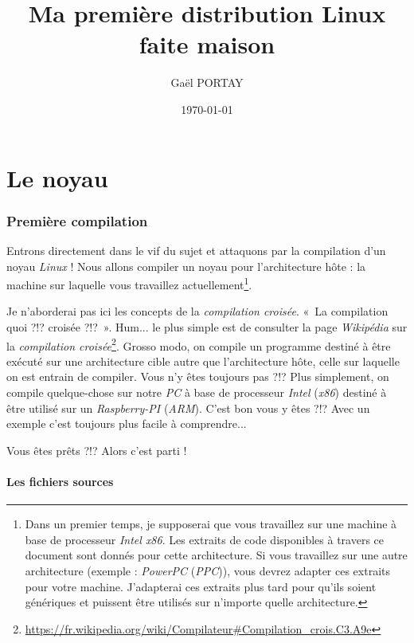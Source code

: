 \documentclass[a4paper]{article}
\title{Ma première distribution Linux faite maison}
\author{Gaël PORTAY}
\date{\today}
\begin{document}
\sloppy
\maketitle

\tableofcontents

\clearpage
\part{Le noyau}

\section{Première compilation}

Entrons directement dans le vif du sujet et attaquons par la compilation d'un noyau \textit{Linux} ! Nous allons compiler un noyau pour l'architecture hôte : la machine sur laquelle vous travaillez actuellement\footnote{Dans un premier temps, je supposerai que vous travaillez sur une machine à base de processeur \textit{Intel x86}. Les extraits de code disponibles à travers ce document sont donnés pour cette architecture. Si vous travaillez sur une autre architecture (exemple : \textit{PowerPC} (\textit{PPC})), vous devrez adapter ces extraits pour votre machine. J'adapterai ces extraits plus tard pour qu'ils soient génériques et puissent être utilisés sur n'importe quelle architecture.}.
\bigskip

Je n'aborderai pas ici les concepts de la \textit{compilation croisée}. «~La compilation quoi ?!? croisée ?!?~». Hum... le plus simple est de consulter la page \textit{Wikipédia} sur la \textit{compilation croisée}\footnote{\url{https://fr.wikipedia.org/wiki/Compilateur\#Compilation\_crois.C3.A9e}}. Grosso modo, on compile un programme destiné à être exécuté sur une architecture cible autre que l'architecture hôte, celle sur laquelle on est entrain de compiler. Vous n'y êtes toujours pas ?!? Plus simplement, on compile quelque-chose sur notre \textit{PC} à base de processeur \textit{Intel} (\textit{x86}) destiné à être utilisé sur un \textit{Raspberry-PI} (\textit{ARM}). C'est bon vous y êtes ?!? Avec un exemple c'est toujours plus facile à comprendre...
\bigskip

Vous êtes prêts ?!? Alors c'est parti !
\bigskip

\subsection{Les fichiers sources}
\end{document}
